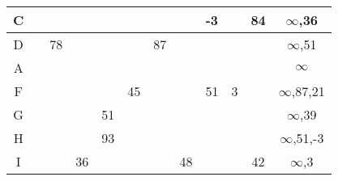 \documentclass[12pt]{article}
\begin{document}
\begin{enumerate}
\begin{tabular}{|c|c|c|c|c|c|c|c|c|c|c|c|}
C     & {\color[HTML]{000000} }         & {\color[HTML]{000000} }         & {\color[HTML]{000000} }         & {\color[HTML]{000000} }         & {\color[HTML]{000000} }    & {\color[HTML]{000000} }         & {\color[HTML]{000000} }         & {\color[HTML]{FE0000} -3}       & {\color[HTML]{000000} }         & {\color[HTML]{000000} 84}       & {\color[HTML]{000000} $\infty$,36}    \\ \hline
D     & {\color[HTML]{000000} }         & {\color[HTML]{FE0000} 78}       & {\color[HTML]{000000} }         & {\color[HTML]{000000} }         & {\color[HTML]{000000} }    & {\color[HTML]{000000} 87}       & {\color[HTML]{000000} }         & {\color[HTML]{FE0000} }         & {\color[HTML]{000000} }         & {\color[HTML]{FE0000} }         & {\color[HTML]{000000} $\infty$,51}    \\ \hline
A     & {\color[HTML]{000000} }         & {\color[HTML]{000000} }         & {\color[HTML]{000000} }         & {\color[HTML]{000000} }         & {\color[HTML]{000000} }    & {\color[HTML]{000000} }         & {\color[HTML]{000000} }         & {\color[HTML]{000000} }         & {\color[HTML]{000000} }         & {\color[HTML]{000000} }         & {\color[HTML]{000000} $\infty$}       \\ \hline
F     & {\color[HTML]{FE0000} }         & {\color[HTML]{000000} }         & {\color[HTML]{000000} }         & {\color[HTML]{FE0000} }         & {\color[HTML]{333333} 45}  & {\color[HTML]{000000} }         & {\color[HTML]{000000} }         & {\color[HTML]{000000} 51}       & {\color[HTML]{FE0000} 3}        & {\color[HTML]{000000} }         & {\color[HTML]{000000} $\infty$,87,21} \\ \hline
G     & {\color[HTML]{000000} }         & {\color[HTML]{000000} }         & {\color[HTML]{000000} }         & {\color[HTML]{FE0000} 51}       & {\color[HTML]{333333} }    & {\color[HTML]{000000} }         & {\color[HTML]{000000} }         & {\color[HTML]{000000} }         & {\color[HTML]{000000} }         & {\color[HTML]{000000} }         & {\color[HTML]{000000} $\infty$,39}    \\ \hline
H     & {\color[HTML]{000000} }         & {\color[HTML]{000000} }         & {\color[HTML]{FE0000} }         & {\color[HTML]{000000} 93}       & {\color[HTML]{333333} }    & {\color[HTML]{000000} }         & {\color[HTML]{FE0000} }         & {\color[HTML]{000000} }         & {\color[HTML]{000000} }         & {\color[HTML]{000000} }         & {\color[HTML]{000000} $\infty$,51,-3} \\ \hline
I     & {\color[HTML]{000000} }         & {\color[HTML]{FE0000} }         & {\color[HTML]{FE0000} 36}       & {\color[HTML]{000000} }         & {\color[HTML]{333333} }    & {\color[HTML]{000000} }         & {\color[HTML]{000000} 48}       & {\color[HTML]{000000} }         & {\color[HTML]{000000} }         & {\color[HTML]{FE0000} 42}       & {\color[HTML]{000000} $\infty$,3}     \\ \hline

\end{tabular}
\end{enumerate}
\end{document}
